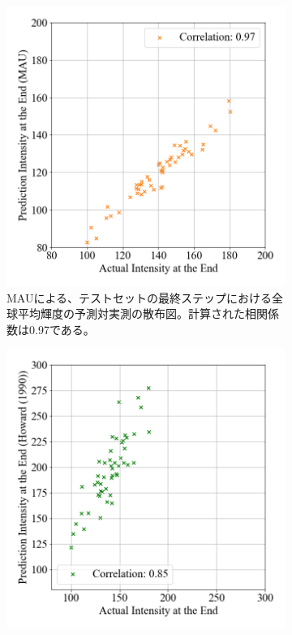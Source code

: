         \begin{figure}[htbp]
          \begin{subfigure}[b]{0.55\textwidth}
            \centering
            \includegraphics[width=\textwidth]{figures/exp2/intensity_scatter_gt_pd.png}
            \caption{MAUによる、テストセットの最終ステップにおける全球平均輝度の予測対実測の散布図。計算された相関係数は0.97である。}
          \end{subfigure}
          \begin{subfigure}[b]{0.55\textwidth}
            \centering
            \includegraphics[width=\textwidth]{figures/exp2/intensity_scatter_gt_dr.png}

\end{subfigure}
\end{figure}
